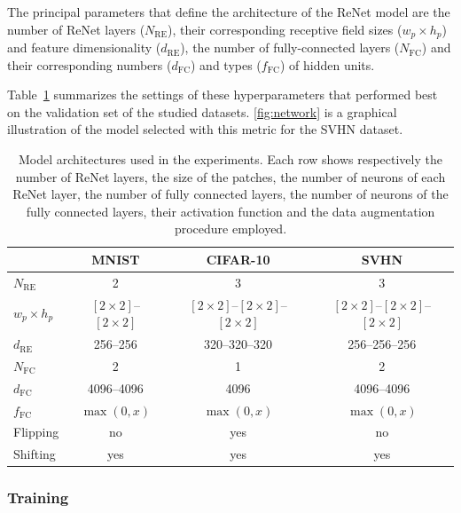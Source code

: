 The principal parameters that define the architecture of the ReNet model are
the number of ReNet layers ($N_{\text{RE}}$), their corresponding receptive
field sizes ($w_p \times h_p$) and feature dimensionality ($d_{\text{RE}}$),
the number of fully-connected layers ($N_{\text{FC}}$) and their corresponding
numbers ($d_{\text{FC}}$) and types ($f_{\text{FC}}$) of hidden units.

Table~\ref{tbl:architectures} summarizes the settings of these hyperparameters
that performed best on the validation set of the studied datasets.
\autoref{fig:network} is a graphical illustration of the model selected with
this metric for the SVHN dataset.

\begin{table}[t]
    \centering
    \begin{tabular}{l || c | c | c }
        & MNIST & CIFAR-10 & SVHN \\
        \hline
        \hline
    $N_{\text{RE}}$ & 2 & 3 & 3 \\
        \hline
        $w_p \times h_p$ & $[2\times 2]$--$[2 \times 2]$ & $[2\times 2]$--$[2 \times 2]$--$[2
        \times 2]$ & $[2\times 2]$--$[2 \times 2]$--$[2 \times 2]$ \\
        \hline
    $d_{\text{RE}}$ & 256--256 & 320--320--320 & 256--256--256 \\
        \hline
    $N_{\text{FC}}$ & 2 & 1 & 2 \\
        \hline
    $d_{\text{FC}}$ & 4096--4096 & 4096 & 4096--4096 \\
        \hline
    $f_{\text{FC}}$ & $\max(0, x)$ & $\max(0,x)$ & $\max(0,x)$ \\
        \hline
    Flipping & no & yes & no \\
        \hline
    Shifting & yes & yes & yes \\
    \end{tabular}
    \caption{Model architectures used in the experiments. Each row shows
             respectively the number of ReNet layers, the size of the patches,
             the number of neurons of each ReNet layer, the number of fully
             connected layers, the number of neurons of the fully connected
             layers, their activation function and the data augmentation
             procedure employed.}
    \label{tbl:architectures}
\end{table}

\subsubsection{Training}

